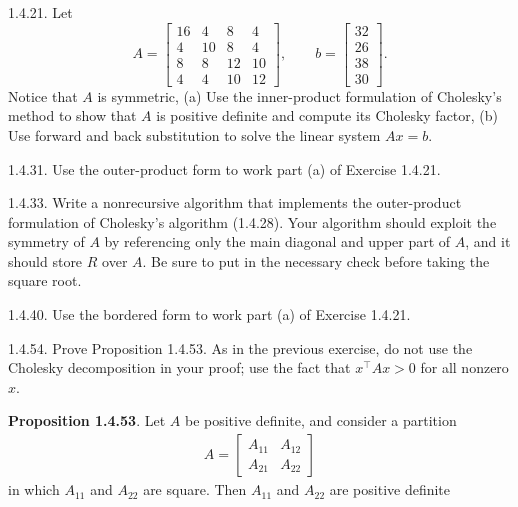 \documentclass{report}
\begin{document}
    \pagebreak \bigbreak \noindent 
    \begin{mdframed}
        1.4.21.  Let
        \[
            A =
            \begin{bmatrix}
                16 & 4 & 8 & 4 \\
                4 & 10 & 8 & 4 \\
                8 & 8 & 12 & 10 \\
                4 & 4 & 10 & 12
            \end{bmatrix},
            \qquad
            b =
            \begin{bmatrix}
                32 \\
                26 \\
                38 \\
                30
            \end{bmatrix}.
        \]
        Notice that $A$ is symmetric, (a) Use the inner-product formulation of Cholesky's method to show that $A$ is positive definite and compute its Cholesky factor, (b) Use forward and back substitution to solve the linear system $Ax =b$. 
    \end{mdframed}

    \pagebreak \bigbreak \noindent 
    \begin{mdframed}
        1.4.31. Use the outer-product form to work part (a) of Exercise 1.4.21. 
    \end{mdframed}

    \pagebreak \bigbreak \noindent 
    \begin{mdframed}
        1.4.33. Write a nonrecursive algorithm that implements the outer-product formulation of Cholesky's algorithm (1.4.28). Your algorithm should exploit the symmetry of $A$ by referencing only the main diagonal and upper part of $A$, and it should store $R$ over $A$. Be sure to put in the necessary check before taking the square root.
    \end{mdframed}

    \pagebreak \bigbreak \noindent 
    \begin{mdframed}
        1.4.40. Use the bordered form to work part (a) of Exercise 1.4.21. 
    \end{mdframed}

    \pagebreak \bigbreak \noindent 
    \begin{mdframed}
        1.4.54. Prove Proposition 1.4.53. 
        \bigbreak \noindent 
        As in the previous exercise, do not use the Cholesky decomposition in your proof; use the fact that $x^{\top} A x > 0$ for all nonzero $x$.
    \end{mdframed}
    \bigbreak \noindent 
    \textbf{Proposition 1.4.53}. Let $A $ be positive definite, and consider a partition
    \begin{align*}
        A = \begin{bmatrix} A_{11} & A_{12} \\ A_{21} & A_{22} \end{bmatrix}

    \end{align*}
    in which $A_{11} $ and $A_{22} $ are square. Then $A_{11}$ and $A_{22}$ are positive definite
\end{document}
